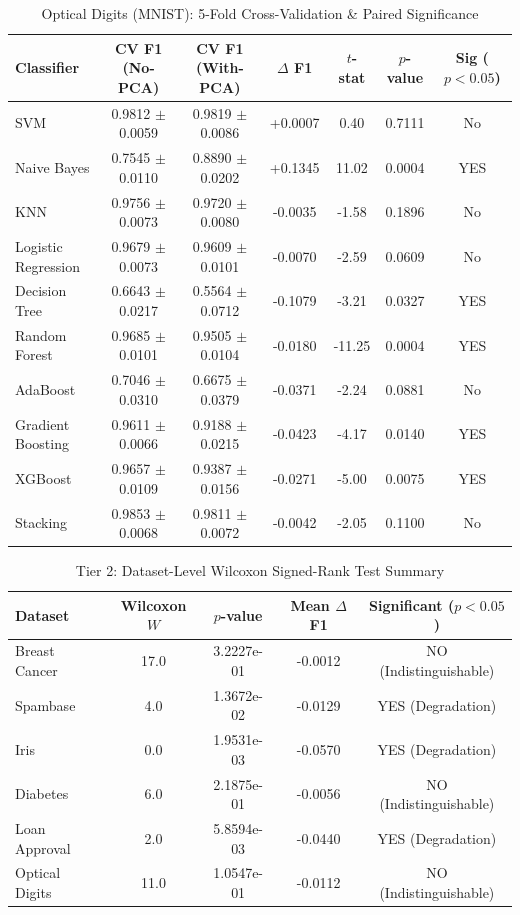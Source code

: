\documentclass[12pt,a4paper]{article}
\begin{document}
\begin{table}[H]
\centering
\footnotesize
\caption{Optical Digits (MNIST): 5-Fold Cross-Validation \& Paired Significance}
\begin{tabular}{lcccccc}
\toprule
\textbf{Classifier} & \textbf{CV F1 (No-PCA)} & \textbf{CV F1 (With-PCA)} & \textbf{$\Delta$ F1} & \textbf{$t$-stat} & \textbf{$p$-value} & \textbf{Sig ($p<0.05$)} \\
\midrule
SVM & 0.9812 $\pm$ 0.0059 & 0.9819 $\pm$ 0.0086 & +0.0007 & 0.40 & 0.7111 & No \\
Naive Bayes & 0.7545 $\pm$ 0.0110 & 0.8890 $\pm$ 0.0202 & +0.1345 & 11.02 & 0.0004 & YES \\
KNN & 0.9756 $\pm$ 0.0073 & 0.9720 $\pm$ 0.0080 & -0.0035 & -1.58 & 0.1896 & No \\
Logistic Regression & 0.9679 $\pm$ 0.0073 & 0.9609 $\pm$ 0.0101 & -0.0070 & -2.59 & 0.0609 & No \\
Decision Tree & 0.6643 $\pm$ 0.0217 & 0.5564 $\pm$ 0.0712 & -0.1079 & -3.21 & 0.0327 & YES \\
Random Forest & 0.9685 $\pm$ 0.0101 & 0.9505 $\pm$ 0.0104 & -0.0180 & -11.25 & 0.0004 & YES \\
AdaBoost & 0.7046 $\pm$ 0.0310 & 0.6675 $\pm$ 0.0379 & -0.0371 & -2.24 & 0.0881 & No \\
Gradient Boosting & 0.9611 $\pm$ 0.0066 & 0.9188 $\pm$ 0.0215 & -0.0423 & -4.17 & 0.0140 & YES \\
XGBoost & 0.9657 $\pm$ 0.0109 & 0.9387 $\pm$ 0.0156 & -0.0271 & -5.00 & 0.0075 & YES \\
Stacking & 0.9853 $\pm$ 0.0068 & 0.9811 $\pm$ 0.0072 & -0.0042 & -2.05 & 0.1100 & No \\
\bottomrule
\end{tabular}
\end{table}

\begin{table}[H]
\centering
\small
\caption{Tier 2: Dataset-Level Wilcoxon Signed-Rank Test Summary}
\begin{tabular}{lcccc}
\toprule
\textbf{Dataset} & \textbf{Wilcoxon $W$} & \textbf{$p$-value} & \textbf{Mean $\Delta$ F1} & \textbf{Significant ($p < 0.05$)} \\
\midrule
Breast Cancer & 17.0 & 3.2227e-01 & -0.0012 & NO (Indistinguishable) \\
Spambase & 4.0 & 1.3672e-02 & -0.0129 & YES (Degradation) \\
Iris & 0.0 & 1.9531e-03 & -0.0570 & YES (Degradation) \\
Diabetes & 6.0 & 2.1875e-01 & -0.0056 & NO (Indistinguishable) \\
Loan Approval & 2.0 & 5.8594e-03 & -0.0440 & YES (Degradation) \\
Optical Digits & 11.0 & 1.0547e-01 & -0.0112 & NO (Indistinguishable) \\
\bottomrule
\end{tabular}
\end{table}
\end{document}
